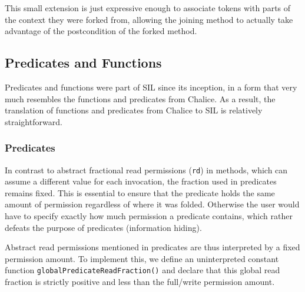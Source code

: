 This small extension is just expressive enough to associate tokens with parts of the context they were forked from, allowing the joining method to actually take advantage of the postcondition of the forked method.

\subsection{Predicates and Functions}\label{sct:pf}
Predicates and functions were part of SIL since its inception, in a form that very much resembles the functions and predicates from Chalice. 
As a result, the translation of functions and predicates from Chalice to SIL is relatively straightforward. 

\subsubsection{Predicates}

In contrast to abstract fractional read permissions (\lstinline[language=Chalice]!rd!) in methods, which can assume a different value for each invocation, the fraction used in predicates remains fixed. 
This is essential to ensure that the predicate holds the same amount of permission regardless of where it was folded. 
Otherwise the user would have to specify exactly how much permission a predicate contains, which rather defeats the purpose of predicates (information hiding).

Abstract read permissions mentioned in predicates are thus interpreted by a fixed permission amount.
To implement this, we define an uninterpreted constant function \texttt{globalPredicateReadFraction()} and declare that this global read fraction is strictly positive and less than the full/write permission amount.


